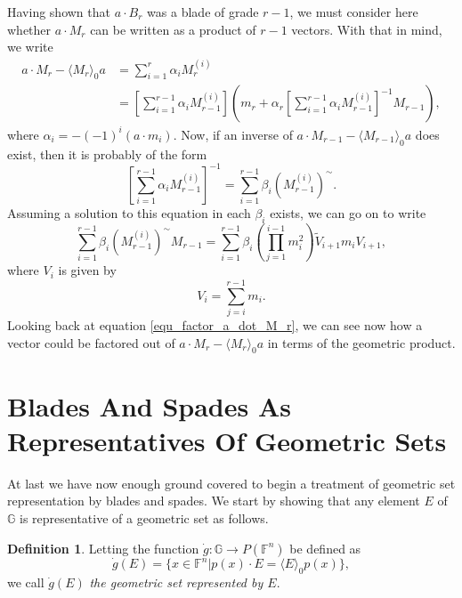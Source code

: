 \documentclass{birkjour}
\theoremstyle{definition}
\newtheorem{defn}[thm]{Definition}
\theoremstyle{remark}
\numberwithin{equation}{section}
\newcommand{\F}{\mathbb{F}}
\newcommand{\G}{\mathbb{G}}
\newcommand{\gd}{\dot{g}}
\begin{document}
Having shown that $a\cdot B_r$ was a blade of grade $r-1$, we must consider here whether $a\cdot M_r$ can be written
as a product of $r-1$ vectors.  With that in mind, we write
\begin{align}
a\cdot M_r - \langle M_r\rangle_0a &= \sum_{i=1}^r\alpha_i M_r^{(i)}\nonumber \\
 &= \left[\sum_{i=1}^{r-1}\alpha_iM_{r-1}^{(i)}\right]\left(m_r + \alpha_r\left[\sum_{i=1}^{r-1}\alpha_iM_{r-1}^{(i)}\right]^{-1}M_{r-1}\right),\label{equ_factor_a_dot_M_r}
\end{align}
where $\alpha_i=-(-1)^i(a\cdot m_i)$.  Now, if an inverse of $a\cdot M_{r-1}-\langle M_{r-1}\rangle_0a$ does exist, then
it is probably of the form
\begin{equation*}
\left[\sum_{i=1}^{r-1}\alpha_iM_{r-1}^{(i)}\right]^{-1} = \sum_{i=1}^{r-1}\beta_i\left(M_{r-1}^{(i)}\right)^{\sim}.
\end{equation*}
Assuming a solution to this equation in each $\beta_i$ exists, we can go on to write
\begin{equation*}
\sum_{i=1}^{r-1}\beta_i\left(M_{r-1}^{(i)}\right)^{\sim}M_{r-1} = \sum_{i=1}^{r-1}\beta_i \left(\prod_{j=1}^{i-1}m_i^2\right)\tilde{V}_{i+1}m_iV_{i+1},
\end{equation*}
where $V_i$ is given by
\begin{equation*}
V_i = \sum_{j=i}^{r-1} m_i.
\end{equation*}
Looking back at equation \eqref{equ_factor_a_dot_M_r}, we can see now how a vector could be factored
out of $a\cdot M_r - \langle M_r\rangle_0a$ in terms of the geometric product.

\section{Blades And Spades As Representatives Of Geometric Sets}

At last we have now enough ground covered to begin a treatment of geometric set representation by blades and spades.
We start by showing that any element $E$ of $\G$ is representative of a geometric set as follows.

\begin{defn}
Letting the function $\gd:\G\to P(\F^n)$ be defined as
\begin{equation*}
\gd(E) = \{x\in\F^n|p(x)\cdot E=\langle E\rangle_0p(x)\},
\end{equation*}
we call $\gd(E)$ \emph{the geometric set represented by $E$}.
\end{defn}
\end{document}
